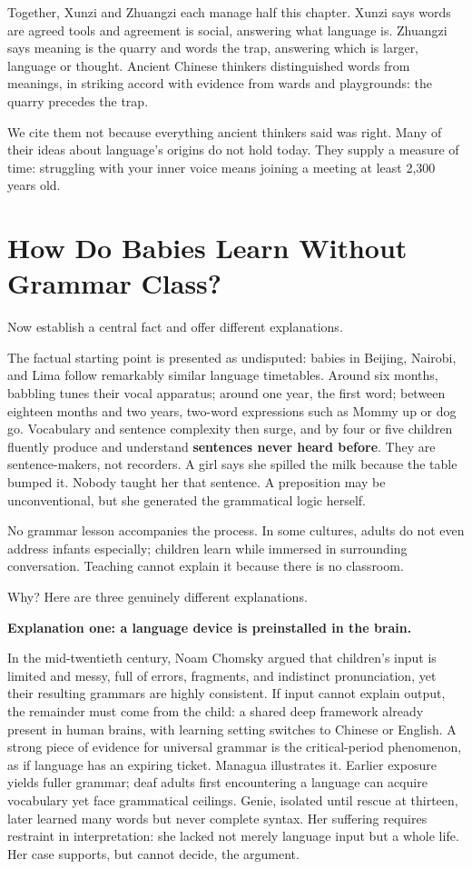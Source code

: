 Together, Xunzi and Zhuangzi each manage half this chapter. Xunzi says words are agreed tools and agreement is social, answering what language is. Zhuangzi says meaning is the quarry and words the trap, answering which is larger, language or thought. Ancient Chinese thinkers distinguished words from meanings, in striking accord with evidence from wards and playgrounds: the quarry precedes the trap.

We cite them not because everything ancient thinkers said was right. Many of their ideas about language's origins do not hold today. They supply a measure of time: struggling with your inner voice means joining a meeting at least 2,300 years old.

\section{How Do Babies Learn Without Grammar Class?}
Now establish a central fact and offer different explanations.

The factual starting point is presented as undisputed: babies in Beijing, Nairobi, and Lima follow remarkably similar language timetables. Around six months, babbling tunes their vocal apparatus; around one year, the first word; between eighteen months and two years, two-word expressions such as Mommy up or dog go. Vocabulary and sentence complexity then surge, and by four or five children fluently produce and understand \textbf{sentences never heard before}. They are sentence-makers, not recorders. A girl says she spilled the milk because the table bumped it. Nobody taught her that sentence. A preposition may be unconventional, but she generated the grammatical logic herself.

No grammar lesson accompanies the process. In some cultures, adults do not even address infants especially; children learn while immersed in surrounding conversation. Teaching cannot explain it because there is no classroom.

Why? Here are three genuinely different explanations.

\textbf{Explanation one: a language device is preinstalled in the brain.}

In the mid-twentieth century, Noam Chomsky argued that children's input is limited and messy, full of errors, fragments, and indistinct pronunciation, yet their resulting grammars are highly consistent. If input cannot explain output, the remainder must come from the child: a shared deep framework already present in human brains, with learning setting switches to Chinese or English. A strong piece of evidence for universal grammar is the critical-period phenomenon, as if language has an expiring ticket. Managua illustrates it. Earlier exposure yields fuller grammar; deaf adults first encountering a language can acquire vocabulary yet face grammatical ceilings. Genie, isolated until rescue at thirteen, later learned many words but never complete syntax. Her suffering requires restraint in interpretation: she lacked not merely language input but a whole life. Her case supports, but cannot decide, the argument.


